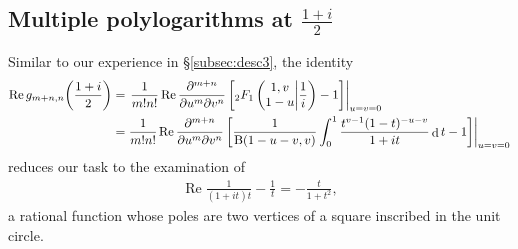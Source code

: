 \documentclass[final,notitlepage,12pt,reqno]{amsart}
\DeclareMathOperator{\D}{d}
\DeclareMathOperator{\R}{Re}
\theoremstyle{plain}
\theoremstyle{definition}
\numberwithin{equation}{section}
\begin{document}
\subsection{Multiple polylogarithms at $\frac{1+i}2$}Similar to our experience in \S\ref{subsec:desc3},  the identity\begin{align}
\begin{split}\R
g_{m+n,n}\bigg(\frac{1+i}2\bigg)={}&\left.\!\frac1{m!n!}\R\frac{\partial^{m+n}}{\partial u^{m}\partial v^n}\left[ {_2}F_1\left(\begin{array}{@{}c@{}}
1,v \\
1-u \\
\end{array}\middle| \frac{1}{i}\right) -1\right]\right|_{u=v=0}\\={}&\frac1{m!n!}\left.\!\R\frac{\partial^{m+n}}{\partial u^{m}\partial v^n}\left[ \frac{1 }{\mathrm B(1-u-v,v)} \int_0^1 \frac{t^{v-1} (1-t)^{-u-v}}{1+it} \D t-1\right]\right|_{u=v=0}
\end{split}
\end{align}reduces our task to the examination of\begin{align}
\R\frac{1}{(1+it)t}-\frac{1}{t}=-\frac{t}{1+t^2},
\end{align} a rational function whose poles are two vertices of a square inscribed in the unit circle.
\end{document}
